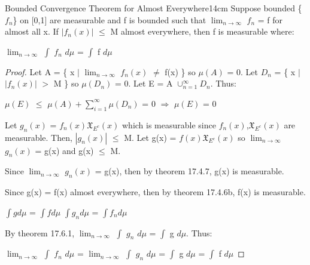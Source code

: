     \newpage



    \begin{wtheorem}{Bounded Convergence Theorem for Almost Everywhere}{14cm}
        Suppose bounded \{$f_n$\} on [0,1] are measurable
        and f is bounded such that $\lim_{n \rightarrow \infty}$ $f_n$ = f
        for almost all x.
        If $|f_n(x)|$ $\leq$ M almost everywhere, then f is measurable where:

        \hspace{0.5cm}
        $\lim_{n \rightarrow \infty}$ $\int$ $f_n$ $d\mu$ = $\int$ f $d\mu$
    \end{wtheorem}

    \begin{proof}
        Let A = \{ x $|$ $\lim_{n \rightarrow \infty}$ $f_n(x)$ $\not =$ f(x) \}
        so $\mu(A)$ = 0.
        Let $D_n$ = \{ x $|$ $|f_n(x)|$ $>$ M \} so $\mu(D_n)$ = 0.
        Let E = A $\cup_{n=1}^{\infty} D_n$. Thus:

        \hspace{0.5cm}
        $\mu(E)$ $\leq$ $\mu(A) + \sum_{i=1}^{\infty} \mu(D_n)$ = 0
        \hspace{1cm}
        $\Rightarrow$
        \hspace{1cm}
        $\mu(E)$ = 0

        Let $g_n(x)$ = $f_n(x) \mathfrak{X}_{E^c}(x)$
        which is measurable since $f_n(x)$,$\mathfrak{X}_{E^c}(x)$
        are measurable. Then, $|g_n(x)|$ $\leq$ M.
        Let g(x) = $f(x) \mathfrak{X}_{E^c}(x)$
        so $\lim_{n \rightarrow \infty}$ $g_n(x)$ = g(x)
        and g(x) $\leq$ M.

        Since $\lim_{n \rightarrow \infty}$ $g_n(x)$ = g(x),
        then by {\color{red} theorem 17.4.7},  g(x) is measurable.

        Since g(x) = f(x) almost everywhere, then
        by {\color{red} theorem 17.4.6b}, f(x) is measurable.

        \hspace{0.5cm}
        $\int g d\mu$ = $\int f d\mu$
        \hspace{1cm}
        $\int g_n d\mu$ = $\int f_n d\mu$

        By {\color{red} theorem 17.6.1},
        $\lim_{n \rightarrow \infty}$ $\int$ $g_n$ $d\mu$ = $\int$ g $d\mu$.
        Thus:

        \hspace{0.5cm}
        $\lim_{n \rightarrow \infty}$ $\int$ $f_n$ $d\mu$
        = $\lim_{n \rightarrow \infty}$ $\int$ $g_n$ $d\mu$
        = $\int$ g $d\mu$
        = $\int$ f $d\mu$
    \end{proof}

